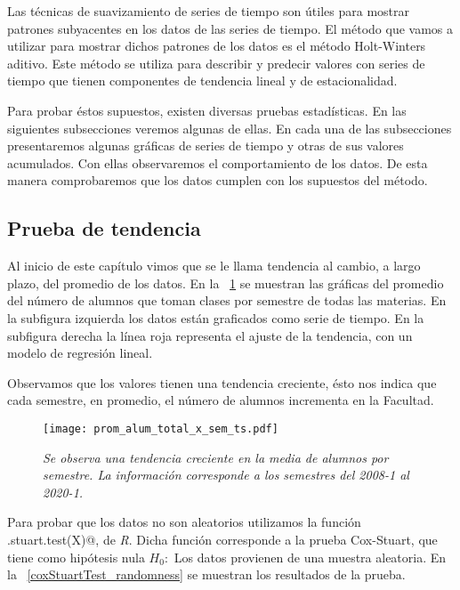 Las técnicas de suavizamiento de series de tiempo son útiles para mostrar patrones subyacentes en los datos de las series de tiempo. El método que vamos a utilizar para mostrar dichos patrones de los datos es el método Holt-Winters aditivo. Este método se utiliza para describir y predecir valores con series de tiempo que tienen componentes de tendencia lineal y de estacionalidad.

Para probar éstos supuestos, existen diversas pruebas estadísticas. En las siguientes subsecciones veremos algunas de ellas. En cada una de las subsecciones presentaremos algunas gráficas de series de tiempo y otras de sus valores acumulados. Con ellas observaremos el comportamiento de los datos. De esta manera comprobaremos que los datos cumplen con los supuestos del método.


\subsection{Prueba de tendencia}

Al inicio de este capítulo vimos que se le llama tendencia al cambio, a largo plazo, del promedio de los datos. En la \figurename{~\ref{prom_alum_x_sem_ts}} se muestran las gráficas del promedio del número de alumnos que toman clases por semestre de todas las materias. En la subfigura izquierda los datos están graficados como serie de tiempo. En la subfigura derecha la línea roja representa el ajuste de la tendencia, con un modelo de regresión lineal.

Observamos que los valores tienen una tendencia creciente, ésto nos indica que cada semestre, en promedio, el número de alumnos incrementa en la Facultad.

\begin{figure}[H]
\centering
\texttt{[image: prom\_alum\_total\_x\_sem\_ts.pdf]} %
\caption[\textit{Media de alumnos por semestre}]{\textit{Se observa una tendencia creciente en la media de alumnos por semestre. La información corresponde a los semestres del 2008-1 al 2020-1.}}\label{prom_alum_x_sem_ts}
\end{figure}

Para probar que los datos no son aleatorios utilizamos la función \verb@cox.stuart.test(X)@, de \textit{R}. Dicha función corresponde a la prueba Cox-Stuart, que tiene como hipótesis nula $H_{0}:$ Los datos provienen de una muestra aleatoria. En la \figurename{~\ref{coxStuartTest_randomness}} se muestran los resultados de la prueba.

